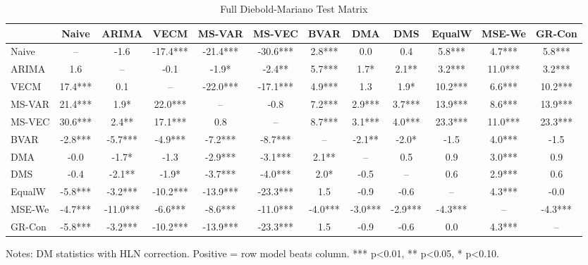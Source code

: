 \begin{table}[htbp]
\centering
\footnotesize
\caption{Full Diebold-Mariano Test Matrix}
\label{tab:dm_full}
\begin{tabular}{lccccccccccc}
\toprule
 & Naive & ARIMA & VECM & MS-VAR & MS-VEC & BVAR & DMA & DMS & EqualW & MSE-We & GR-Con \\
\midrule
Naive & -- & -1.6 & -17.4*** & -21.4*** & -30.6*** & 2.8*** & 0.0 & 0.4 & 5.8*** & 4.7*** & 5.8*** \\
ARIMA & 1.6 & -- & -0.1 & -1.9* & -2.4** & 5.7*** & 1.7* & 2.1** & 3.2*** & 11.0*** & 3.2*** \\
VECM & 17.4*** & 0.1 & -- & -22.0*** & -17.1*** & 4.9*** & 1.3 & 1.9* & 10.2*** & 6.6*** & 10.2*** \\
MS-VAR & 21.4*** & 1.9* & 22.0*** & -- & -0.8 & 7.2*** & 2.9*** & 3.7*** & 13.9*** & 8.6*** & 13.9*** \\
MS-VEC & 30.6*** & 2.4** & 17.1*** & 0.8 & -- & 8.7*** & 3.1*** & 4.0*** & 23.3*** & 11.0*** & 23.3*** \\
BVAR & -2.8*** & -5.7*** & -4.9*** & -7.2*** & -8.7*** & -- & -2.1** & -2.0* & -1.5 & 4.0*** & -1.5 \\
DMA & -0.0 & -1.7* & -1.3 & -2.9*** & -3.1*** & 2.1** & -- & 0.5 & 0.9 & 3.0*** & 0.9 \\
DMS & -0.4 & -2.1** & -1.9* & -3.7*** & -4.0*** & 2.0* & -0.5 & -- & 0.6 & 2.9*** & 0.6 \\
EqualW & -5.8*** & -3.2*** & -10.2*** & -13.9*** & -23.3*** & 1.5 & -0.9 & -0.6 & -- & 4.3*** & -0.0 \\
MSE-We & -4.7*** & -11.0*** & -6.6*** & -8.6*** & -11.0*** & -4.0*** & -3.0*** & -2.9*** & -4.3*** & -- & -4.3*** \\
GR-Con & -5.8*** & -3.2*** & -10.2*** & -13.9*** & -23.3*** & 1.5 & -0.9 & -0.6 & 0.0 & 4.3*** & -- \\
\bottomrule
\end{tabular}
\begin{tablenotes}
\footnotesize
\item Notes: DM statistics with HLN correction. 
Positive = row model beats column. 
*** p<0.01, ** p<0.05, * p<0.10.
\end{tablenotes}
\end{table}